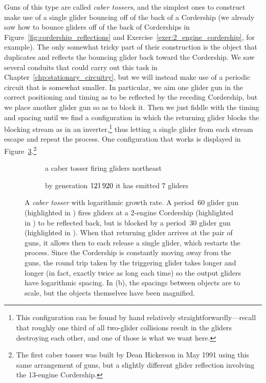 Guns of this type are called \emph{caber tossers}, and the simplest ones to construct make use of a single glider bouncing off of the back of a Cordership (we already saw how to bounce gliders off of the back of Corderships in Figure~\ref{fig:cordership_reflections} and Exercise~\ref{exer:2_engine_cordership}, for example). The only somewhat tricky part of their construction is the object that duplicates and reflects the bouncing glider back toward the Cordership. We saw several conduits that could carry out this task in Chapter~\ref{chp:stationary_circuitry}, but we will instead make use of a periodic circuit that is somewhat smaller. In particular, we aim one glider gun in the correct positioning and timing as to be reflected by the receding Cordership, but we place another glider gun so as to block it. Then we just fiddle with the timing and spacing until we find a configuration in which the returning glider blocks the blocking stream as in an inverter,\footnote{This configuration can be found by hand relatively straightforwardly---recall that roughly one third of all two-glider collisions result in the gliders destroying each other, and one of those is what we want here.} thus letting a single glider from each stream escape and repeat the process. One configuration that works is displayed in Figure~\ref{fig:caber_tosser}.\footnote{The first caber tosser was built by Dean Hickerson in May 1991 using this same arrangement of guns, but a slightly different glider reflection involving the 13-engine Cordership.}

\begin{figure}[!htb]
	\centering
	\begin{subfigure}{.51\textwidth}
		\centering
		\caption{a caber tosser firing gliders northeast}
		\label{fig:caber_tosser_0}
	\end{subfigure} \hfill \begin{subfigure}{.46\textwidth}
		\centering
		\caption{by generation $121{\,}920$ it has emitted $7$ gliders}
		\label{fig:caber_tosser_121920}
	\end{subfigure}
	\caption{A \emph{caber tosser} with logarithmic growth rate. A period~$60$ glider gun (highlighted in ) fires gliders at a 2-engine Cordership (highlighted in ) to be reflected back, but is blocked by a period~$30$ glider gun (highlighted in ). When that returning glider arrives at the pair of guns, it allows then to each release a single glider, which restarts the process. Since the Cordership is constantly moving away from the guns, the round trip taken by the triggering glider takes longer and longer (in fact, exactly twice as long each time) so the output gliders have logarithmic spacing. In (b), the spacings between objects are to scale, but the objects themselves have been magnified.}
	\label{fig:caber_tosser}
\end{figure}

